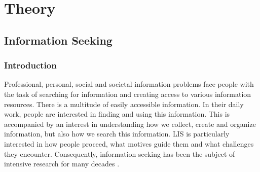 \documentclass[12pt, a4paper, titlepage, oneside, abstract=true, toc=listof, toc=bibliography, BCOR=1cm]{scrreprt}
\begin{document}
\chapter{Theory}

\section{Information Seeking}
\label{sec:IS}

\subsection{Introduction}
Professional, personal, social and societal information problems face people with the task of searching for information and creating access to various information resources. There is a multitude of easily accessible information. In their daily work, people are interested in finding and using this information. This is accompanied by an interest in understanding how we collect, create and organize information, but also how we search this information. \gls{LIS} is particularly interested in how people proceed, what motives guide them and what challenges they encounter. Consequently, information seeking has been the subject of intensive research for many decades \citep[p. 55ff]{Ingwersen2005}. 
\end{document}
